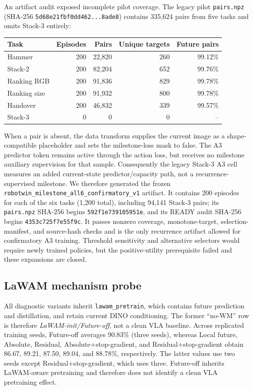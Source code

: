 An artifact audit exposed incomplete pilot coverage.  The legacy pilot
\texttt{pairs.npz} (SHA-256 \texttt{5d68e21fbf0dd462...8ade8}) contains 335,624
pairs from five tasks and omits Stack-3 entirely:
\begin{center}\small
\begin{tabular}{lrrrr}
\toprule
Task & Episodes & Pairs & Unique targets & Future pairs \\
\midrule
Hammer & 200 & 22,820 & 260 & 99.12\% \\
Stack-2 & 200 & 82,204 & 652 & 99.76\% \\
Ranking RGB & 200 & 91,836 & 829 & 99.78\% \\
Ranking size & 200 & 91,932 & 800 & 99.78\% \\
Handover & 200 & 46,832 & 339 & 99.57\% \\
Stack-3 & 0 & 0 & 0 & -- \\
\bottomrule
\end{tabular}
\end{center}
When a pair is absent, the data transform supplies the current image as a
shape-compatible placeholder and sets the milestone-loss mask to false.  The
A3 predictor token remains active through the action loss, but receives no
milestone auxiliary supervision for that sample.  Consequently the legacy
Stack-3 A3 cell measures an added current-state predictor/capacity path, not a
recurrence-supervised milestone.  We therefore generated the frozen
\texttt{robotwin\_milestone\_all6\_confirmatory\_v1} artifact.  It contains 200
episodes for each of the six tasks (1,200 total), including 94,141 Stack-3
pairs; its \texttt{pairs.npz} SHA-256 begins
\texttt{592f1e739105951e}, and its READY audit SHA-256 begins
\texttt{4353c725f7e55f9c}.  It passes nonzero coverage, monotone-target,
selection-manifest, and source-hash checks and is the only recurrence artifact
allowed for confirmatory A3 training.  Threshold sensitivity and alternative
selectors would require newly trained policies, but the positive-utility
prerequisite failed and these expansions are closed.

\subsection{LaWAM mechanism probe}
All diagnostic variants inherit \texttt{lawam\_pretrain}, which contains future
prediction and distillation, and retain current DINO conditioning.  The former
``no-WM'' row is therefore \emph{LaWAM-init/Future-off}, not a clean VLA
baseline.  Across replicated training seeds, Future-off averages 90.83\%
(three seeds), whereas Local future, Absolute, Residual,
Absolute+stop-gradient, and Residual+stop-gradient obtain 86.67, 89.21, 87.50,
89.04, and 88.78\%, respectively.  The latter values use two seeds except
Residual+stop-gradient, which uses three.  Future-off inherits LaWAM-aware
pretraining and therefore does not identify a clean VLA pretraining effect.

